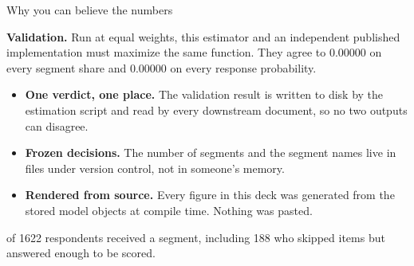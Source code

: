 \documentclass[
  ignorenonframetext,
  aspectratio=169,
]{beamer}
\newcommand{\kicker}[1]{\par\noindent{\footnotesize\color{vteal}\textbf{\MakeUppercase{#1}}}\par\vspace{0.4em}}
\begin{document}
\begin{frame}[shrink]{Why you can believe the numbers}
\label{why-you-can-believe-the-numbers}
\kicker{trust checks}

\small

\textbf{Validation.} Run at equal weights, this estimator and an
independent published implementation must maximize the same function.
They agree to 0.00000 on every segment share and 0.00000 on every
response probability.

\vspace{0.2em}

\begin{itemize}\itemsep3pt
  \item \textbf{One verdict, one place.} The validation result is written to disk by the estimation script and read by every downstream document, so no two outputs can disagree.
  \item \textbf{Frozen decisions.} The number of segments and the segment names live in files under version control, not in someone's memory.
  \item \textbf{Rendered from source.} Every figure in this deck was generated from the stored model objects at compile time. Nothing was pasted.
\end{itemize}

\vspace{0.4em}
\begin{center}
\colorbox{vteal!15}{\parbox{0.9\textwidth}{ of 1622 respondents received a segment, including 188 who skipped items but answered enough to be scored.}}
\end{center}

\end{frame}
\end{document}
